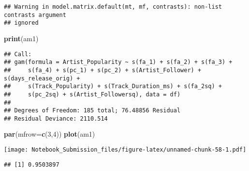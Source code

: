 \documentclass[
]{article}
\newenvironment{Shaded}{\begin{snugshade}}{\end{snugshade}}
\newcommand{\DataTypeTok}[1]{\textcolor[rgb]{0.13,0.29,0.53}{#1}}
\newcommand{\DecValTok}[1]{\textcolor[rgb]{0.00,0.00,0.81}{#1}}
\newcommand{\KeywordTok}[1]{\textcolor[rgb]{0.13,0.29,0.53}{\textbf{#1}}}
\newcommand{\NormalTok}[1]{#1}
\newcommand{\OperatorTok}[1]{\textcolor[rgb]{0.81,0.36,0.00}{\textbf{#1}}}
\newcommand{\StringTok}[1]{\textcolor[rgb]{0.31,0.60,0.02}{#1}}
\begin{document}
\begin{verbatim}
## Warning in model.matrix.default(mt, mf, contrasts): non-list contrasts argument
## ignored
\end{verbatim}

\begin{Shaded}
\begin{Highlighting}[]
\KeywordTok{print}\NormalTok{(am1)}
\end{Highlighting}
\end{Shaded}

\begin{verbatim}
## Call:
## gam(formula = Artist_Popularity ~ s(fa_1) + s(fa_2) + s(fa_3) + 
##     s(fa_4) + s(pc_1) + s(pc_2) + s(Artist_Follower) + s(days_release_orig) + 
##     s(Track_Popularity) + s(Track_Duration_ms) + s(fa_2sq) + 
##     s(pc_2sq) + s(Artist_Followersq), data = df)
## 
## Degrees of Freedom: 185 total; 76.48856 Residual
## Residual Deviance: 2110.514
\end{verbatim}

\begin{Shaded}
\begin{Highlighting}[]
\KeywordTok{par}\NormalTok{(}\DataTypeTok{mfrow=}\KeywordTok{c}\NormalTok{(}\DecValTok{3}\NormalTok{,}\DecValTok{4}\NormalTok{))}
\KeywordTok{plot}\NormalTok{(am1)}
\end{Highlighting}
\end{Shaded}

\texttt{[image: Notebook\_Submission\_files/figure-latex/unnamed-chunk-58-1.pdf]}

\begin{Shaded}
\end{Shaded}

\begin{verbatim}
## [1] 0.9503897
\end{verbatim}
\end{document}
